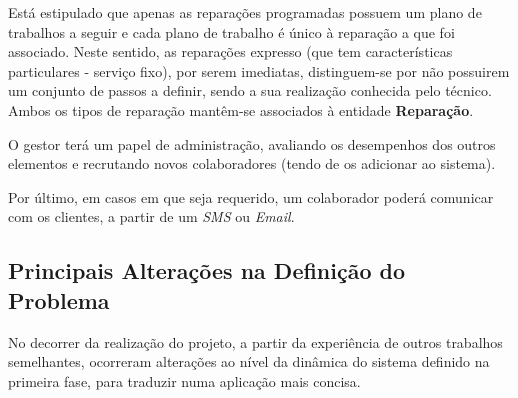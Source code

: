 \documentclass[a4paper,12pt]{scrreprt}
\begin{document}
Está estipulado que apenas as reparações programadas possuem um plano de trabalhos a seguir e cada plano de trabalho é único à 
reparação a que foi associado.
Neste sentido, as reparações expresso (que tem características particulares - serviço fixo), por serem imediatas, distinguem-se 
por não possuirem um conjunto de passos a definir, sendo a sua realização conhecida pelo técnico.
Ambos os tipos de reparação mantêm-se associados à entidade \textbf{Reparação}.

O gestor terá um papel de administração, avaliando os desempenhos dos outros elementos e
recrutando novos colaboradores (tendo de os adicionar ao sistema).

Por último, em casos em que seja requerido, um colaborador poderá comunicar com os clientes, a partir de um \textit{SMS} ou \textit{Email}.

\subsection{Principais Alterações na Definição do Problema}\label{princ_alter_prob}

No decorrer da realização do projeto, a partir da experiência de outros trabalhos semelhantes, ocorreram alterações ao
nível da dinâmica do sistema definido na primeira fase, para traduzir numa aplicação mais concisa.
\end{document}
